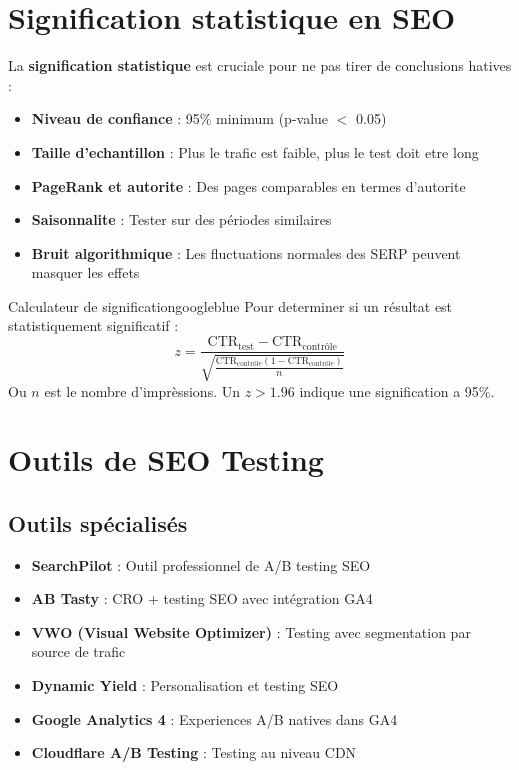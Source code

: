 \documentclass[12pt,a4paper,twoside]{report}
\newcommand{\keyword}[1]{\textbf{\textcolor{googleblue}{#1}}}
\begin{document}
\section{Signification statistique en SEO}

La \keyword{signification statistique} est cruciale pour ne pas tirer de conclusions hatives :

\begin{itemize}
    \item \textbf{Niveau de confiance} : 95\% minimum (p-value $<$ 0.05)
    \item \textbf{Taille d'echantillon} : Plus le trafic est faible, plus le test doit etre long
    \item \textbf{PageRank et autorite} : Des pages comparables en termes d'autorite
    \item \textbf{Saisonnalite} : Tester sur des périodes similaires
    \item \textbf{Bruit algorithmique} : Les fluctuations normales des SERP peuvent masquer les effets
\end{itemize}

\begin{mybox}{Calculateur de signification}{googleblue}
Pour determiner si un résultat est statistiquement significatif :
\[
z = \frac{\text{CTR}_{\text{test}} - \text{CTR}_{\text{contrôle}}}
{\sqrt{\frac{\text{CTR}_{\text{contrôle}}(1 - \text{CTR}_{\text{contrôle}})}{n}}}
\]
Ou $n$ est le nombre d'imprèssions. Un $z > 1.96$ indique une signification a 95\%.
\end{mybox}

\section{Outils de SEO Testing}

\subsection{Outils spécialisés}

\begin{itemize}
    \item \textbf{SearchPilot} : Outil professionnel de A/B testing SEO
    \item \textbf{AB Tasty} : CRO + testing SEO avec intégration GA4
    \item \textbf{VWO (Visual Website Optimizer)} : Testing avec segmentation par source de trafic
    \item \textbf{Dynamic Yield} : Personalisation et testing SEO
    \item \textbf{Google Analytics 4} : Experiences A/B natives dans GA4
    \item \textbf{Cloudflare A/B Testing} : Testing au niveau CDN
\end{itemize}
\end{document}
